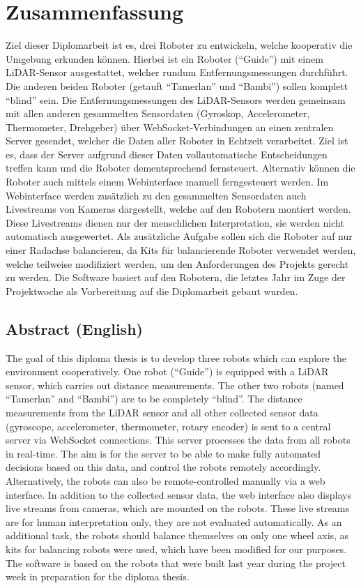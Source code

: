 
\chapter{Zusammenfassung}
Ziel dieser Diplomarbeit ist es, drei Roboter zu entwickeln,
welche kooperativ die Umgebung erkunden können.
%
Hierbei ist ein Roboter (``Guide'') mit einem LiDAR-Sensor ausgestattet,
welcher rundum Entfernungsmessungen durchführt.
%
Die anderen beiden Roboter (getauft ``Tamerlan'' und ``Bambi'')
sollen komplett ``blind'' sein.
%
Die Entfernungsmessungen des LiDAR-Sensors werden
gemeinsam mit allen anderen gesammelten Sensordaten
(Gyroskop, Accelerometer, Thermometer, Drehgeber)
über WebSocket-Verbindungen an einen zentralen Server gesendet,
welcher die Daten aller Roboter in Echtzeit verarbeitet.
%
Ziel ist es, dass der Server aufgrund dieser Daten
vollautomatische Entscheidungen treffen kann und die Roboter dementsprechend fernsteuert.
%
Alternativ können die Roboter auch mittels einem Webinterface manuell ferngesteuert werden.
%
Im Webinterface werden zusätzlich zu den gesammelten Sensordaten
auch Livestreams von Kameras dargestellt,
welche auf den Robotern montiert werden.
%
Diese Livestreams dienen nur der menschlichen Interpretation,
sie werden nicht automatisch ausgewertet.
%
Als zusätzliche Aufgabe sollen sich die Roboter auf nur einer Radachse balancieren,
da Kits für balancierende Roboter verwendet werden,
welche teilweise modifiziert werden,
um den Anforderungen des Projekts gerecht zu werden.
%
Die Software basiert auf den Robotern,
die letztes Jahr im Zuge der Projektwoche als Vorbereitung auf die Diplomarbeit gebaut wurden.

\section{Abstract (English)}
The goal of this diploma thesis is to develop three robots which
can explore the environment cooperatively.
%
One robot (``Guide'') is equipped with a LiDAR sensor,
which carries out distance measurements.
%
The other two robots (named ``Tamerlan'' and ``Bambi'')
are to be completely ``blind''.
%
The distance measurements from the LiDAR sensor and all other collected sensor data
(gyroscope, accelerometer, thermometer, rotary encoder)
is sent to a central server via WebSocket connections.
This server processes the data from all robots in real-time.
%
The aim is for the server to be able to make fully automated decisions based on this data,
and control the robots remotely accordingly.
%
Alternatively, the robots can also be remote-controlled manually via a web interface.
%
In addition to the collected sensor data, the web interface
also displays live streams from cameras,
which are mounted on the robots.
%
These live streams are for human interpretation only,
they are not evaluated automatically.
%
As an additional task, the robots should balance themselves on only one wheel axis,
as kits for balancing robots were used,
which have been modified for our purposes.
The software is based on the robots
that were built last year during the project week in preparation for the diploma thesis.